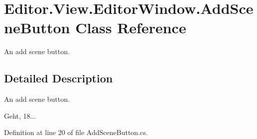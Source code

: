 \section{Editor.\-View.\-Editor\-Window.\-Add\-Scene\-Button Class Reference}
\label{class_editor_1_1_view_1_1_editor_window_1_1_add_scene_button}


An add scene button.  




\subsection{Detailed Description}
An add scene button. 

Geht, 18... 

Definition at line 20 of file Add\-Scene\-Button.\-cs.

